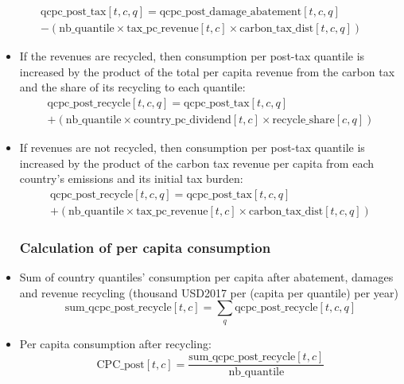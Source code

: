 \documentclass[
]{article}
\begin{document}
\begin{multline}
  \text{qcpc\_post\_tax}[t,c,q] = \text{qcpc\_post\_damage\_abatement}[t,c,q] \\
 - (\text{nb\_quantile} \times \text{tax\_pc\_revenue}[t,c] \times \text{carbon\_tax\_dist}[t,c,q]) 
\end{multline}


\begin{itemize}
\item
  If the revenues are recycled, then consumption per post-tax quantile
  is increased by the product of the total per capita revenue from the
  carbon tax and the share of its recycling to each quantile:
  \begin{multline}
    \text{qcpc\_post\_recycle}[t,c,q] = \text{qcpc\_post\_tax}[t,c,q] \\
+ (\text{nb\_quantile} \times \text{country\_pc\_dividend}[t,c] \times \text{recycle\_share}[c,q])
  \end{multline}

\item
  If revenues are not recycled, then consumption per post-tax quantile
  is increased by the product of the carbon tax revenue per capita from
  each country's emissions and its initial tax burden:
  \begin{multline}
    \text{qcpc\_post\_recycle}[t,c,q] = \text{qcpc\_post\_tax}[t,c,q] \\
 + (\text{nb\_quantile} \times \text{tax\_pc\_revenue}[t,c] \times \text{carbon\_tax\_dist}[t,c,q]) 
  \end{multline}

  \subsubsection{Calculation of per capita consumption}\label{calculation-per-capita-consumption}

\item
Sum of country quantiles' consumption per capita after abatement, damages and revenue recycling (thousand USD2017 per (capita per quantile) per year)
  \begin{equation}
    \text{sum\_qcpc\_post\_recycle}[t,c] = \sum_q \text{qcpc\_post\_recycle}[t,c,q]
\end{equation}

\item
  Per capita consumption after recycling:
  \begin{equation}
    \text{CPC\_post}[t,c] = \frac{\text{sum\_qcpc\_post\_recycle}[t,c]}{\text{nb\_quantile}} 
\end{equation}


\end{itemize}
\end{document}

